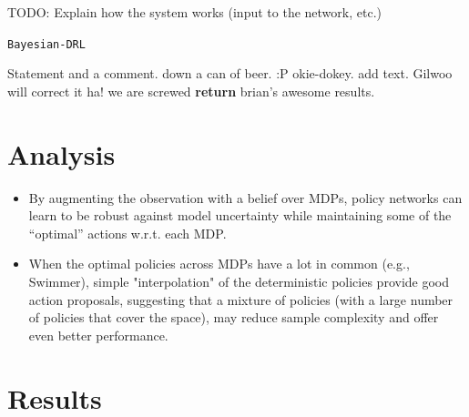\documentclass{article}
\DeclareMathOperator*{\argmin}{arg\,min}
\begin{document}
TODO: Explain how the system works (input to the network, etc.)
%
%
\begin{algorithm}[tb]
\caption{\texttt{Bayesian-DRL}}
\label{alg:highLevel}	
\begin{algorithmic}[1]
\State Statement and a comment. 
\vspace{2mm}
  
	\State down a can of beer. :P
\EndFor
\State okie-dokey.
	\State add text.
		\State Gilwoo will correct it ha!
	\Else
		\State we are screwed
	\EndIf   		
\EndWhile
\State \textbf{return} brian's awesome results.
\end{algorithmic}
\end{algorithm}

\section{Analysis}

\begin{itemize}
	\item By augmenting the observation with a belief over 	MDPs, policy networks can learn to be robust against 	model uncertainty while maintaining some of the
	``optimal'' actions w.r.t. each MDP.
	\item When the optimal policies across MDPs have a lot in 	common (e.g., Swimmer), simple "interpolation" of the deterministic policies provide good action proposals,
	suggesting that a mixture of policies (with a large number of policies that cover the space), may reduce sample complexity and offer even better performance.
\end{itemize}

\section{Results}
\end{document}
